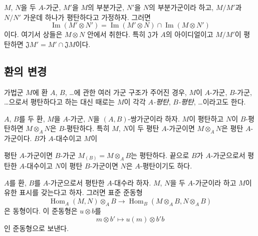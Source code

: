 \begin{env}[6.1.4]
\label{0.6.1.4-ko}
$M$, $N$을 두 $A$-가군, $M'$을 $M$의 부분가군, $N'$을 $N$의
부분가군이라 하고, $M/M'$과 $N/N'$ 가운데 하나가 평탄하다고
가정하자. 그러면
\[
  \operatorname{Im}(M'\otimes N')
  =\operatorname{Im}(M'\otimes N)\cap
   \operatorname{Im}(M\otimes N')
\]
이다. 여기서 상들은 $M\otimes N$ 안에서 취한다. 특히
$\mathfrak J$가 $A$의 아이디얼이고 $M/M'$이 평탄하면
$\mathfrak JM'=M'\cap\mathfrak JM$이다.
\end{env}

\subsection{환의 변경}
\label{subsection:0.6.2-ko}

가법군 $M$에 환 $A$, $B$, \ldots{}에 관한 여러 가군 구조가 주어진
경우, $M$이 $A$-가군, $B$-가군, \ldots{}으로서 평탄하다고 하는 대신
때로는 $M$이 각각 \emph{$A$-평탄}, \emph{$B$-평탄}, \ldots{}이라고도
한다.

\begin{env}[6.2.1]
\label{0.6.2.1-ko}
$A$, $B$를 두 환, $M$을 $A$-가군, $N$을 $(A,B)$-쌍가군이라 하자.
$M$이 평탄하고 $N$이 $B$-평탄하면 $M\otimes_A N$은
$B$-평탄하다. 특히 $M$, $N$이 두 평탄 $A$-가군이면
$M\otimes_A N$은 평탄 $A$-가군이다. $B$가 $A$-대수이고 $M$이


평탄 $A$-가군이면 $B$-가군 $M_{(B)}=M\otimes_A B$는 평탄하다.
끝으로 $B$가 $A$-가군으로서 평탄한 $A$-대수이고 $N$이 평탄
$B$-가군이면 $N$은 $A$-평탄이기도 하다.
\end{env}

\begin{env}[6.2.2]
\label{0.6.2.2-ko}
$A$를 환, $B$를 $A$-가군으로서 평탄한 $A$-대수라 하자.
$M$, $N$을 두 $A$-가군이라 하고 $M$이 유한 표시를 갖는다고 하자.
그러면 표준 준동형
\[
  \operatorname{Hom}_A(M,N)\otimes_A B
  \longrightarrow
  \operatorname{Hom}_B(M\otimes_A B,N\otimes_A B)
  \tag{6.2.2.1}
\]
은 동형이다. 이 준동형은 $u\otimes b$를
\[
  m\otimes b'\longmapsto u(m)\otimes b'b
\]
인 준동형으로 보낸다.
\end{env}

